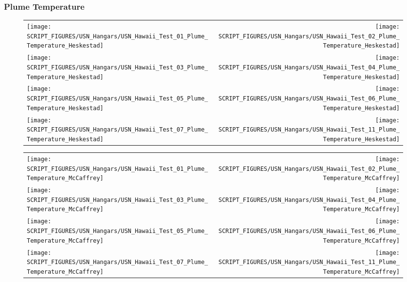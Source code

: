 \subsubsection{Plume Temperature}

\begin{figure}[p]
\begin{tabular*}{\textwidth}{l@{\extracolsep{\fill}}r}
\texttt{[image: SCRIPT\_FIGURES/USN\_Hangars/USN\_Hawaii\_Test\_01\_Plume\_Temperature\_Heskestad]} &
\texttt{[image: SCRIPT\_FIGURES/USN\_Hangars/USN\_Hawaii\_Test\_02\_Plume\_Temperature\_Heskestad]} \\
\texttt{[image: SCRIPT\_FIGURES/USN\_Hangars/USN\_Hawaii\_Test\_03\_Plume\_Temperature\_Heskestad]} &
\texttt{[image: SCRIPT\_FIGURES/USN\_Hangars/USN\_Hawaii\_Test\_04\_Plume\_Temperature\_Heskestad]} \\
\texttt{[image: SCRIPT\_FIGURES/USN\_Hangars/USN\_Hawaii\_Test\_05\_Plume\_Temperature\_Heskestad]} &
\texttt{[image: SCRIPT\_FIGURES/USN\_Hangars/USN\_Hawaii\_Test\_06\_Plume\_Temperature\_Heskestad]} \\
\texttt{[image: SCRIPT\_FIGURES/USN\_Hangars/USN\_Hawaii\_Test\_07\_Plume\_Temperature\_Heskestad]} &
\texttt{[image: SCRIPT\_FIGURES/USN\_Hangars/USN\_Hawaii\_Test\_11\_Plume\_Temperature\_Heskestad]}
\end{tabular*}
\end{figure}

\begin{figure}[p]
\begin{tabular*}{\textwidth}{l@{\extracolsep{\fill}}r}
\texttt{[image: SCRIPT\_FIGURES/USN\_Hangars/USN\_Hawaii\_Test\_01\_Plume\_Temperature\_McCaffrey]} &
\texttt{[image: SCRIPT\_FIGURES/USN\_Hangars/USN\_Hawaii\_Test\_02\_Plume\_Temperature\_McCaffrey]} \\
\texttt{[image: SCRIPT\_FIGURES/USN\_Hangars/USN\_Hawaii\_Test\_03\_Plume\_Temperature\_McCaffrey]} &
\texttt{[image: SCRIPT\_FIGURES/USN\_Hangars/USN\_Hawaii\_Test\_04\_Plume\_Temperature\_McCaffrey]} \\
\texttt{[image: SCRIPT\_FIGURES/USN\_Hangars/USN\_Hawaii\_Test\_05\_Plume\_Temperature\_McCaffrey]} &
\texttt{[image: SCRIPT\_FIGURES/USN\_Hangars/USN\_Hawaii\_Test\_06\_Plume\_Temperature\_McCaffrey]} \\
\texttt{[image: SCRIPT\_FIGURES/USN\_Hangars/USN\_Hawaii\_Test\_07\_Plume\_Temperature\_McCaffrey]} &
\texttt{[image: SCRIPT\_FIGURES/USN\_Hangars/USN\_Hawaii\_Test\_11\_Plume\_Temperature\_McCaffrey]}
\end{tabular*}
\end{figure}

